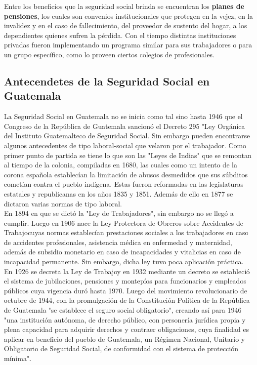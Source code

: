 \documentclass[12pt,letterpaper,titlepage]{article}
\begin{document}
{Entre los beneficios que la seguridad social brinda se encuentran los \textbf{planes de pensiones}, los cuales son convenios institucionales que protegen en la vejez, en la invalidez y en el caso de fallecimiento, del proveedor de sustento del hogar, a los dependientes quienes sufren la pérdida. Con el tiempo distintas instituciones privadas fueron implementando un programa similar para sus trabajadores o para un grupo específico, como lo proveen ciertos colegios de profesionales. 

\subsection{Antecendetes de la Seguridad Social en Guatemala}

La Seguridad Social en Guatemala no se inicia como tal sino hasta 1946 que el Congreso de la República de Guatemala sancionó el Decreto 295 "Ley Orgánica del Instituto Guatemalteco de Seguridad Social. Sin embargo pueden encontrarse algunos antecedentes de tipo laboral-social que velaron por el trabajador. Como primer punto de partida se tiene lo que son las "Leyes de Indias" que se remontan al tiempo de la colonia, compiladas en 1680, las cuales como un intento de la corona española establecían la limitación de abusos desmedidos que sus súbditos cometían contra el pueblo indígena. Estas fueron reformadas en las legislaturas estatales y republicanas en los años 1835 y 1851. Además de ello en 1877 se dictaron varias normas de tipo laboral.\\

En 1894 en que se dictó la "Ley de Trabajadores", sin embargo no se llegó a cumplir. Luego en 1906 nace la \textgravedbl Ley Protectora de Obreros sobre Accidentes de Trabajo\textacutedbl cuyas normas establecían prestaciones sociales a los trabajadores en caso de accidentes profesionales, asistencia médica en enfermedad y maternidad, además de subsidio monetario en caso de incapacidades y vitalicias en caso de incapacidad permanente. Sin embargo, dicha ley tuvo poca aplicación práctica. \\

En 1926 se decreta la \textgravedbl Ley de Trabajo\textacutedbl y en 1932 mediante un decreto se estableció el sistema de jubilaciones, pensiones y montepíos para funcionarios y empleados públicos cuya vigencia duró hasta 1970. Luego del movimiento revolucionario de octubre de 1944, con la promulgación de la Constitución Política de la República de Guatemala "se establece el seguro social obligatorio", creando así para 1946 "una institución autónoma, de derecho público, con personería jurídica propia y plena capacidad para adquirir derechos y contraer obligaciones, cuya finalidad es aplicar en beneficio del pueblo de Guatemala, un Régimen Nacional, Unitario y Obligatorio de Seguridad Social, de conformidad con el sistema de protección mínima".

}
\end{document}
